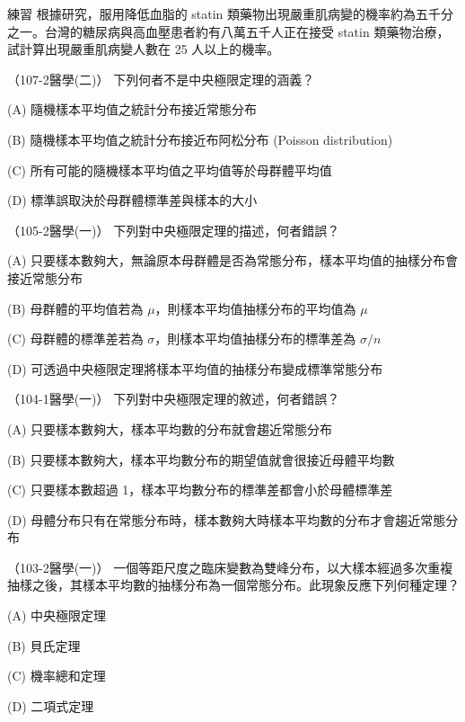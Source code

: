     \bigskip

    \begin{custom}{練習}
        根據研究，服用降低血脂的 statin 類藥物出現嚴重肌病變的機率約為五千分之一。台灣的糖尿病與高血壓患者約有八萬五千人正在接受 statin 類藥物治療，試計算出現嚴重肌病變人數在 25 人以上的機率。
    \end{custom}

    \begin{docexam}{（107-2醫學(二)）}
        下列何者不是中央極限定理的涵義？
        
        (A) 隨機樣本平均值之統計分布接近常態分布
        
        (B) 隨機樣本平均值之統計分布接近布阿松分布 (Poisson distribution)
        
        (C) 所有可能的隨機樣本平均值之平均值等於母群體平均值
        
        (D) 標準誤取決於母群體標準差與樣本的大小
    \end{docexam}

    \begin{docexam}{（105-2醫學(一)）}
        下列對中央極限定理的描述，何者錯誤？
        
        (A) 只要樣本數夠大，無論原本母群體是否為常態分布，樣本平均值的抽樣分布會接近常態分布
        
        (B) 母群體的平均值若為 $\mu$，則樣本平均值抽樣分布的平均值為 $\mu$
        
        (C) 母群體的標準差若為 $\sigma$，則樣本平均值抽樣分布的標準差為 $\sigma/n$
        
        (D) 可透過中央極限定理將樣本平均值的抽樣分布變成標準常態分布
    \end{docexam}

    \begin{docexam}{（104-1醫學(一)）}
        下列對中央極限定理的敘述，何者錯誤？
        
        (A) 只要樣本數夠大，樣本平均數的分布就會趨近常態分布
        
        (B) 只要樣本數夠大，樣本平均數分布的期望值就會很接近母體平均數
        
        (C) 只要樣本數超過 1，樣本平均數分布的標準差都會小於母體標準差
        
        (D) 母體分布只有在常態分布時，樣本數夠大時樣本平均數的分布才會趨近常態分布
    \end{docexam}

    \begin{docexam}{（103-2醫學(一)）}
        一個等距尺度之臨床變數為雙峰分布，以大樣本經過多次重複抽樣之後，其樣本平均數的抽樣分布為一個常態分布。此現象反應下列何種定理？
        
        (A) 中央極限定理
        
        (B) 貝氏定理
        
        (C) 機率總和定理
        
        (D) 二項式定理
    \end{docexam}

